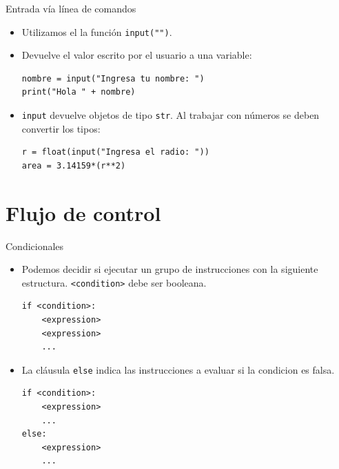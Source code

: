\documentclass[mathserif]{beamer}
\begin{document}
\begin{frame}[fragile]{Entrada vía línea de comandos}
    \begin{itemize}
        \item Utilizamos el la función \lstinline|input("")|.
        
        \item Devuelve el valor escrito por el usuario a una variable:
\begin{lstlisting}
nombre = input("Ingresa tu nombre: ")
print("Hola " + nombre)
\end{lstlisting}

        \item \lstinline|input| devuelve objetos de tipo \lstinline|str|. Al trabajar con números se deben convertir los tipos:
\begin{lstlisting}
r = float(input("Ingresa el radio: "))
area = 3.14159*(r**2)
\end{lstlisting}

    \end{itemize}
\end{frame}

\section{Flujo de control}

\begin{frame}[fragile]{Condicionales}
    \begin{itemize}
        \item Podemos decidir si ejecutar un grupo de instrucciones con la siguiente estructura. \lstinline|<condition>| debe ser booleana.
\begin{lstlisting}
if <condition>:
    <expression>
    <expression>
    ...
\end{lstlisting}

        \item La cláusula \lstinline|else| indica las instrucciones a evaluar si la condicion es {\blue falsa}.
\begin{lstlisting}
if <condition>:
    <expression>
    ...
else:
    <expression>
    ...
\end{lstlisting}

    \end{itemize}
    
\end{frame}
\end{document}

